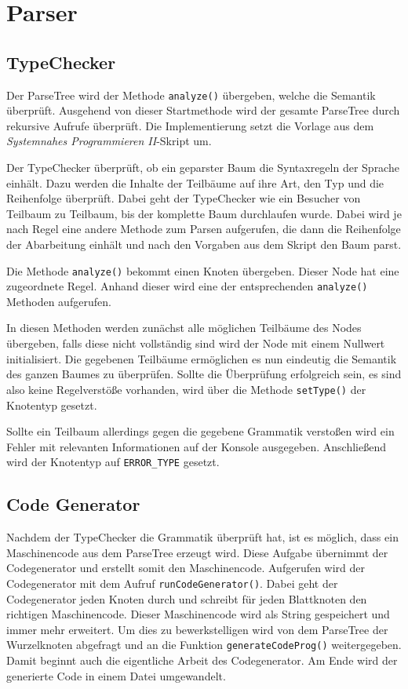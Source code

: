 \chapter{Parser}\label{chap:Parser}

\section{TypeChecker}
Der ParseTree wird der Methode \texttt{analyze()} übergeben, welche die Semantik überprüft. Ausgehend von dieser Startmethode wird der gesamte ParseTree durch rekursive Aufrufe überprüft. Die Implementierung setzt die Vorlage aus dem \emph{Systemnahes Programmieren II}-Skript um.

Der TypeChecker überprüft, ob ein geparster Baum die Syntaxregeln der Sprache einhält. Dazu werden die Inhalte der Teilbäume auf ihre Art, den Typ und die Reihenfolge überprüft. Dabei geht der TypeChecker wie ein Besucher von Teilbaum zu Teilbaum, bis der komplette Baum durchlaufen wurde.
Dabei wird je nach Regel eine andere Methode zum Parsen aufgerufen, die dann die Reihenfolge der Abarbeitung einhält und nach den Vorgaben aus dem Skript den Baum parst.

Die Methode \texttt{analyze()} bekommt einen Knoten übergeben. Dieser Node hat eine zugeordnete Regel. Anhand dieser wird eine der entsprechenden \texttt{analyze()} Methoden aufgerufen.

In diesen Methoden werden zunächst alle möglichen Teilbäume des Nodes übergeben, falls diese nicht vollständig sind wird der Node mit einem Nullwert initialisiert.
Die gegebenen Teilbäume ermöglichen es nun eindeutig die Semantik des ganzen Baumes zu überprüfen. Sollte die Überprüfung erfolgreich sein, es sind also keine Regelverstöße vorhanden, wird über die Methode \texttt{setType()} der Knotentyp gesetzt.

Sollte ein Teilbaum allerdings gegen die gegebene Grammatik verstoßen wird ein Fehler mit relevanten Informationen auf der Konsole ausgegeben. Anschließend wird der Knotentyp auf \texttt{ERROR\_TYPE} gesetzt.

\section{Code Generator}
Nachdem der TypeChecker die Grammatik überprüft hat, ist es möglich, dass ein Maschinencode aus dem ParseTree erzeugt wird. Diese Aufgabe übernimmt der Codegenerator und erstellt somit den Maschinencode. Aufgerufen wird der Codegenerator mit dem Aufruf \texttt{runCodeGenerator()}. Dabei geht der Codegenerator jeden Knoten durch und schreibt für jeden Blattknoten den richtigen Maschinencode. Dieser Maschinencode wird als String gespeichert und immer mehr erweitert. Um dies zu bewerkstelligen wird von dem ParseTree der Wurzelknoten abgefragt und an die Funktion \texttt{generateCodeProg()} weitergegeben. Damit beginnt auch die eigentliche Arbeit des Codegenerator. Am Ende wird der generierte Code in einem Datei umgewandelt.

